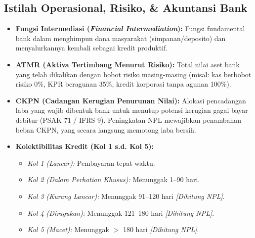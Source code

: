 \documentclass[11pt,a4paper]{article}
\begin{document}
\subsection{Istilah Operasional, Risiko, \& Akuntansi Bank}
\begin{itemize}
    \item \textbf{Fungsi Intermediasi (\textit{Financial Intermediation}):} Fungsi fundamental bank dalam menghimpun dana masyarakat (simpanan/deposito) dan menyalurkannya kembali sebagai kredit produktif.
    \item \textbf{ATMR (Aktiva Tertimbang Menurut Risiko):} Total nilai aset bank yang telah dikalikan dengan bobot risiko masing-masing (misal: kas berbobot risiko 0\%, KPR beragunan 35\%, kredit korporasi tanpa agunan 100\%).
    \item \textbf{CKPN (Cadangan Kerugian Penurunan Nilai):} Alokasi pencadangan laba yang wajib dibentuk bank untuk menutup potensi kerugian gagal bayar debitur (PSAK 71 / IFRS 9). Peningkatan NPL mewajibkan penambahan beban CKPN, yang secara langsung memotong laba bersih.
    \item \textbf{Kolektibilitas Kredit (Kol 1 s.d. Kol 5):}
    \begin{itemize}
        \item \textit{Kol 1 (Lancar):} Pembayaran tepat waktu.
        \item \textit{Kol 2 (Dalam Perhatian Khusus):} Menunggak 1--90 hari.
        \item \textit{Kol 3 (Kurang Lancar):} Menunggak 91--120 hari \textit{[Dihitung NPL]}.
        \item \textit{Kol 4 (Diragukan):} Menunggak 121--180 hari \textit{[Dihitung NPL]}.
        \item \textit{Kol 5 (Macet):} Menunggak $>$ 180 hari \textit{[Dihitung NPL]}.
    \end{itemize}
\end{itemize}
\end{document}
